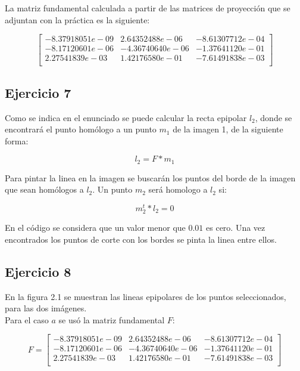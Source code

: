 \documentclass[paper=a4, fontsize=11pt]{scrartcl} %
\numberwithin{equation}{section} %
\numberwithin{figure}{section} %
\numberwithin{table}{section} %
\begin{document}
La matriz fundamental calculada a partir de las matrices de proyección que se adjuntan con la práctica es la siguiente:

\begin{equation}
	\begin{bmatrix}
		-8.37918051e-09  &  2.64352488e-06 & -8.61307712e-04 \\
		-8.17120601e-06  & -4.36740640e-06 & -1.37641120e-01 \\
 		2.27541839e-03   & 1.42176580e-01  & -7.61491838e-03 \\
	\end{bmatrix}
\end{equation}

\subsection{Ejercicio 7}

Como se indica en el enunciado se puede calcular la recta epipolar $l_2$, donde se encontrará el punto homólogo a un punto $m_1$ de la imagen 1, de la siguiente forma:

\begin{equation}
	l_2 = F * m_1
\end{equation}

Para pintar la linea en la imagen se buscarán los puntos del borde de la imagen que sean homólogos a $l_2$. Un punto $m_2$ será homologo a $l_2$ si:

\begin{equation}
	m_2^t * l_2 = 0
\end{equation}

En el código se considera que un valor menor que $0.01$ es cero.
Una vez encontrados los puntos de corte con los bordes se pinta la linea entre ellos.

\subsection{Ejercicio 8}

En la figura 2.1 se muestran las lineas epipolares de los puntos seleccionados, para las dos imágenes.\\
Para el caso $a$ se usó la matriz fundamental $F$:

\begin{equation}
	F =
	\begin{bmatrix}
		-8.37918051e-09  &  2.64352488e-06 & -8.61307712e-04 \\
		-8.17120601e-06  & -4.36740640e-06 & -1.37641120e-01 \\
 		2.27541839e-03   & 1.42176580e-01  & -7.61491838e-03 \\
	\end{bmatrix}
\end{equation}
\end{document}
